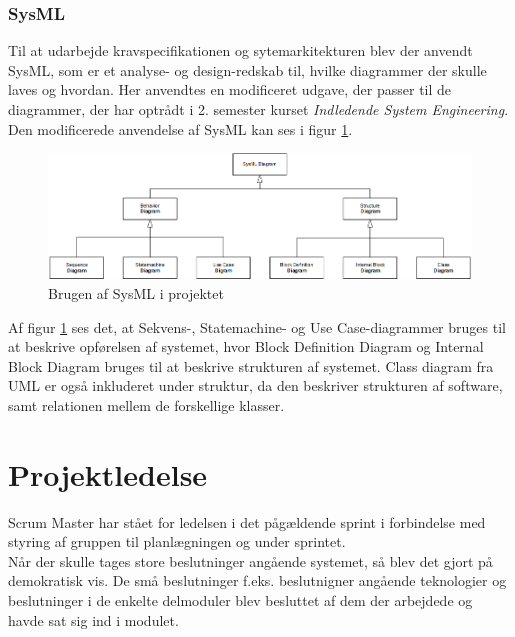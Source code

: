 \documentclass[a4paper,12pt,fleqn,oneside]{article}
\begin{document}
\subsubsection{SysML}
Til at udarbejde kravspecifikationen og sytemarkitekturen blev der anvendt SysML, som er et analyse- og design-redskab til, hvilke diagrammer der skulle laves og hvordan. Her anvendtes en modificeret udgave, der passer til de diagrammer, der har optrådt i 2. semester kurset \textit{Indledende System Engineering}. Den modificerede anvendelse af SysML kan ses i figur \ref{fig:Sysml_usage}.
\begin{figure}[H]
    \centering
    \includegraphics[width=\textwidth]{Processdokument/graphics/Sysml_usage.png}
    \caption{Brugen af SysML i projektet}
    \label{fig:Sysml_usage}
\end{figure}

Af figur \ref{fig:Sysml_usage} ses det, at Sekvens-, Statemachine- og Use Case-diagrammer bruges til at beskrive opførelsen af systemet, hvor Block Definition Diagram og Internal Block Diagram bruges til at beskrive strukturen af systemet. Class diagram fra UML er også inkluderet under struktur, da den beskriver strukturen af software, samt relationen mellem de forskellige klasser. 


\section{Projektledelse}
Scrum Master har stået for ledelsen i det pågældende sprint i forbindelse med styring af gruppen til planlægningen og under sprintet. 
\\Når der skulle tages store beslutninger angående systemet, så blev det gjort på demokratisk vis. De små beslutninger f.eks. beslutnigner angående teknologier og beslutninger i de enkelte delmoduler blev besluttet af dem der arbejdede og havde sat sig ind i modulet.
\end{document}
